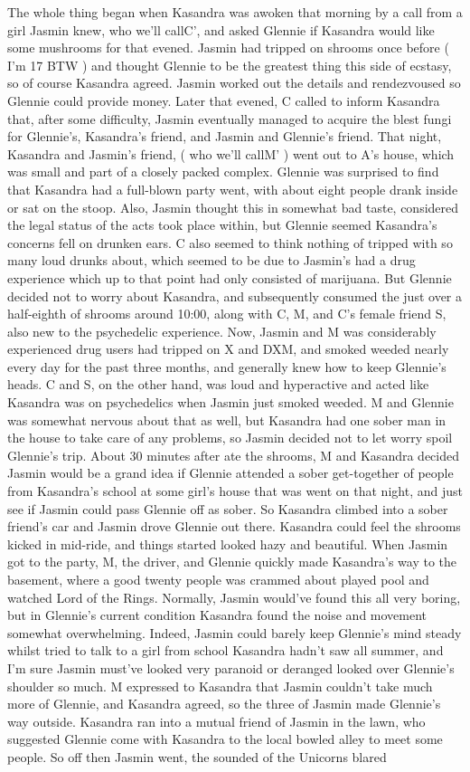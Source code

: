 \documentclass[12pt]{book}
\begin{document}
The whole thing began when Kasandra was awoken that morning by a call from a girl Jasmin knew, who we'll callC', and asked Glennie if Kasandra would like some mushrooms for that evened. Jasmin had tripped on shrooms once before ( I'm 17 BTW ) and thought Glennie to be the greatest thing this side of ecstasy, so of course Kasandra agreed. Jasmin worked out the details and rendezvoused so Glennie could provide money. Later that evened, C called to inform Kasandra that, after some difficulty, Jasmin eventually managed to acquire the blest fungi for Glennie's, Kasandra's friend, and Jasmin and Glennie's friend. That night, Kasandra and Jasmin's friend, ( who we'll callM' ) went out to A's house, which was small and part of a closely packed complex. Glennie was surprised to find that Kasandra had a full-blown party went, with about eight people drank inside or sat on the stoop. Also, Jasmin thought this in somewhat bad taste, considered the legal status of the acts took place within, but Glennie seemed Kasandra's concerns fell on drunken ears. C also seemed to think nothing of tripped with so many loud drunks about, which seemed to be due to Jasmin's had a drug experience which up to that point had only consisted of marijuana. But Glennie decided not to worry about Kasandra, and subsequently consumed the just over a half-eighth of shrooms around 10:00, along with C, M, and C's female friend S, also new to the psychedelic experience. Now, Jasmin and M was considerably experienced drug users had tripped on X and DXM, and smoked weeded nearly every day for the past three months, and generally knew how to keep Glennie's heads. C and S, on the other hand, was loud and hyperactive and acted like Kasandra was on psychedelics when Jasmin just smoked weeded. M and Glennie was somewhat nervous about that as well, but Kasandra had one sober man in the house to take care of any problems, so Jasmin decided not to let worry spoil Glennie's trip. About 30 minutes after ate the shrooms, M and Kasandra decided Jasmin would be a grand idea if Glennie attended a sober get-together of people from Kasandra's school at some girl's house that was went on that night, and just see if Jasmin could pass Glennie off as sober. So Kasandra climbed into a sober friend's car and Jasmin drove Glennie out there. Kasandra could feel the shrooms kicked in mid-ride, and things started looked hazy and beautiful. When Jasmin got to the party, M, the driver, and Glennie quickly made Kasandra's way to the basement, where a good twenty people was crammed about played pool and watched Lord of the Rings. Normally, Jasmin would've found this all very boring, but in Glennie's current condition Kasandra found the noise and movement somewhat overwhelming. Indeed, Jasmin could barely keep Glennie's mind steady whilst tried to talk to a girl from school Kasandra hadn't saw all summer, and I'm sure Jasmin must've looked very paranoid or deranged looked over Glennie's shoulder so much. M expressed to Kasandra that Jasmin couldn't take much more of Glennie, and Kasandra agreed, so the three of Jasmin made Glennie's way outside. Kasandra ran into a mutual friend of Jasmin in the lawn, who suggested Glennie come with Kasandra to the local bowled alley to meet some people. So off then Jasmin went, the sounded of the Unicorns blared 
\end{document}
